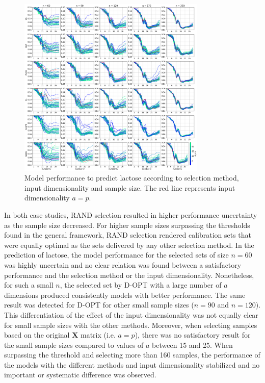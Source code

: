 \documentclass[journal=ancham,manuscript=article]{achemso}
\begin{document}
\begin{figure}[b]
\includegraphics[width=0.8\textwidth]{manuscript/figures/d01_milk_model_performance.png}
\centering
\caption{Model performance to predict lactose according to selection method, input dimensionality and sample size. The red line represents input dimensionality $a=p$.}
\label{fig_d01_milk_model_performance}
\end{figure}

In both case studies, RAND selection resulted in higher performance uncertainty as the sample size decreased. For higher sample sizes surpassing the thresholds found in the general framework, RAND selection rendered calibration sets that were equally optimal as the sets delivered by any other selection method. In the prediction of lactose, the model performance for the selected sets of size $n=60$ was highly uncertain and no clear relation was found between a satisfactory performance and the selection method or the input dimensionality. Nonetheless, for such a small $n$, the selected set by D-OPT with a large number of $a$ dimensions produced consistently models with better performance. The same result was detected for D-OPT for other small sample sizes ($n=90$ and $n=120$). This differentiation of the effect of the input dimensionality was not equally clear for small sample sizes with the other methods. Moreover, when selecting samples based on the original $\mathbf{X}$ matrix (i.e. $a=p$), there was no satisfactory result for the small sample sizes compared to values of $a$ between 15 and 25. When surpassing the threshold and selecting more than 160 samples, the performance of the models with the different methods and input dimensionality stabilized and no important or systematic difference was observed.
\end{document}
